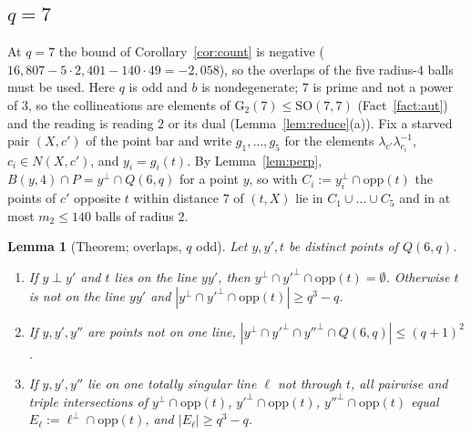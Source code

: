 \documentclass[11pt]{amsart}
\theoremstyle{plain}
\newtheorem{lemma}{Lemma}[section]
\theoremstyle{definition}
\theoremstyle{remark}
\newcommand{\opp}{\mathrm{opp}}
\newcommand{\GG}{\mathrm{G}_2}
\newcommand{\ip}{\perp}
\newcommand{\pP}{P}  %
\begin{document}
\subsection{$q = 7$}
At $q = 7$ the bound of Corollary~\ref{cor:count} is negative ($16{,}807 - 5 \cdot 2{,}401 - 140 \cdot 49 = -2{,}058$),
so the overlaps of the five radius-$4$ balls must be used. Here $q$ is odd and $b$ is nondegenerate; $7$ is prime and not
a power of $3$, so the collineations are elements of $\GG(7) \le \mathrm{SO}(7,7)$ (Fact~\ref{fact:aut}) and the reading
is reading 2 or its dual (Lemma~\ref{lem:reduce}(a)). Fix a starved pair $(X, c')$ of the point bar and write
$g_1, \dots, g_5$ for the elements $\lambda_{c'}\lambda_{c_i}^{-1}$, $c_i \in N(X,c')$, and $y_i = g_i(t)$. By
Lemma~\ref{lem:perp}, $B(y,4) \cap \pP = y^\perp \cap Q(6,q)$ for a point $y$, so with $C_i := y_i^\perp \cap \opp(t)$
the points of $c'$ opposite $t$ within distance $7$ of $(t,X)$ lie in $C_1 \cup \dots \cup C_5$ and in at most
$m_2 \le 140$ balls of radius $2$.

\begin{lemma}[Theorem; overlaps, $q$ odd]\label{lem:overlap}
Let $y, y', t$ be distinct points of $Q(6,q)$.
\begin{enumerate}[label=(\alph*)]
\item If $y \ip y'$ and $t$ lies on the line $yy'$, then $y^\perp \cap y'^\perp \cap \opp(t) = \emptyset$. Otherwise $t$ is
  not on the line $yy'$ and $|y^\perp \cap y'^\perp \cap \opp(t)| \ge q^3 - q$.
\item If $y, y', y''$ are points not on one line, $|y^\perp \cap y'^\perp \cap y''^\perp \cap Q(6,q)| \le (q+1)^2$.
\item If $y, y', y''$ lie on one totally singular line $\ell$ not through $t$, all pairwise and triple intersections of
  $y^\perp \cap \opp(t)$, $y'^\perp \cap \opp(t)$, $y''^\perp \cap \opp(t)$ equal $E_\ell := \ell^\perp \cap \opp(t)$, and
  $|E_\ell| \ge q^3 - q$.
\end{enumerate}
\end{lemma}
\end{document}
